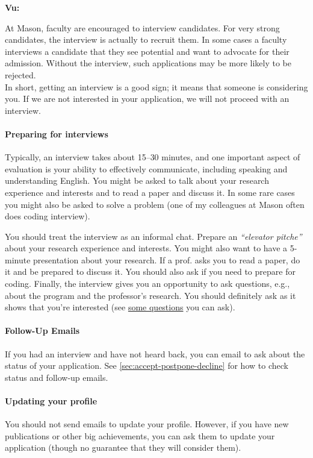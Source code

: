 \documentclass[oneside,11pt,dvipsnames]{book}
\newenvironment{commentbox}[1][]{
  \small
  \begin{mybox}
    {\small \textbf{#1}}
  }{
  \end{mybox}
}
\begin{document}
\begin{commentbox}[Vu:]
    At Mason, faculty are encouraged to interview candidates. For very strong candidates, the interview is actually to recruit them.  In some cases a faculty interviews a candidate that they see potential and want to advocate for their admission. Without the interview, such applications may be more likely to be rejected.\\
    
    In short, getting an interview is a good sign; it means that someone is considering you. If we are not interested in your application, we will not proceed with an interview.
\end{commentbox}

\paragraph{Preparing for interviews} Typically, an interview takes about 15--30 minutes, and one important aspect of evaluation is your ability to effectively communicate, including speaking and understanding English. 
You might be asked to talk about your research experience and interests and to read a paper and discuss it. In some rare cases you might also be asked to solve a problem (one of my colleagues at Mason often does coding interview).


You should treat the interview as an informal chat. Prepare an \emph{``elevator pitche''} about your research experience and interests. You might also want to have a 5-minute presentation about your research. If a prof. asks you to read a paper, do it and be prepared to discuss it. You should also ask if you need to prepare for coding. Finally, the interview gives you an opportunity to ask questions, e.g., about the program and the professor's research.  You should definitely ask as it shows that you're interested (see \href{https://github.com/dynaroars/dynaroars.github.io/wiki/Answers-to-Ph.D-Advisor-Guide}{some questions} you can ask).



\paragraph{Follow-Up Emails} If you had an interview and have not heard back, you can email to ask about the status of your application. See \autoref{sec:accept-postpone-decline} for how to check status and follow-up emails.



\paragraph{Updating your profile} You should not send emails to update your profile.  However, if you have new publications or other big achievements, you can ask them to update your application (though no guarantee that they will consider them).
\end{document}
